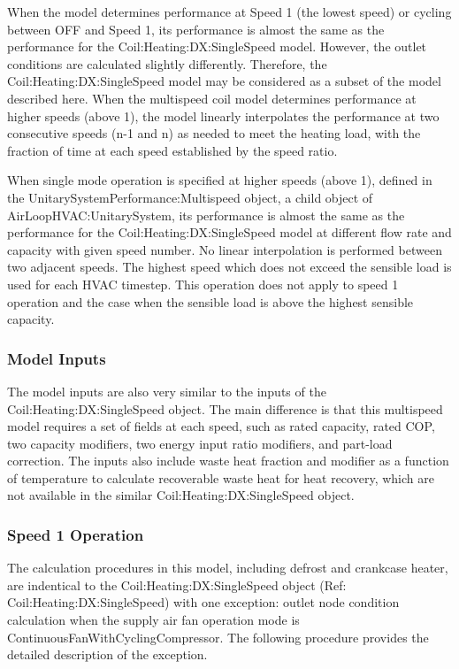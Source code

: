 When the model determines performance at Speed 1 (the lowest speed) or cycling between OFF and Speed 1, its performance is almost the same as the performance for the Coil:Heating:DX:SingleSpeed model. However, the outlet conditions are calculated slightly differently. Therefore, the Coil:Heating:DX:SingleSpeed model may be considered as a subset of the model described here. When the multispeed coil model determines performance at higher speeds (above 1), the model linearly interpolates the performance at two consecutive speeds (n-1 and n) as needed to meet the heating load, with the fraction of time at each speed established by the speed ratio.

When single mode operation is specified at higher speeds (above 1), defined in the UnitarySystemPerformance:Multispeed object, a child object of AirLoopHVAC:UnitarySystem, its performance is almost the same as the performance for the Coil:Heating:DX:SingleSpeed model at different flow rate and capacity with given speed number. No linear interpolation is performed between two adjacent speeds. The highest speed which does not exceed the sensible load is used for each HVAC timestep. This operation does not apply to speed 1 operation and the case when the sensible load is above the highest sensible capacity.

\subsubsection{Model Inputs}\label{model-inputs-3}

The model inputs are also very similar to the inputs of the Coil:Heating:DX:SingleSpeed object. The main difference is that this multispeed model requires a set of fields at each speed, such as rated capacity, rated COP, two capacity modifiers, two energy input ratio modifiers, and part-load correction. The inputs also include waste heat fraction and modifier as a function of temperature to calculate recoverable waste heat for heat recovery, which are not available in the similar Coil:Heating:DX:SingleSpeed object.

\subsubsection{Speed 1 Operation}\label{speed-1-operation-1}

The calculation procedures in this model, including defrost and crankcase heater, are indentical to the Coil:Heating:DX:SingleSpeed object (Ref: Coil:Heating:DX:SingleSpeed) with one exception: outlet node condition calculation when the supply air fan operation mode is ContinuousFanWithCyclingCompressor. The following procedure provides the detailed description of the exception.

